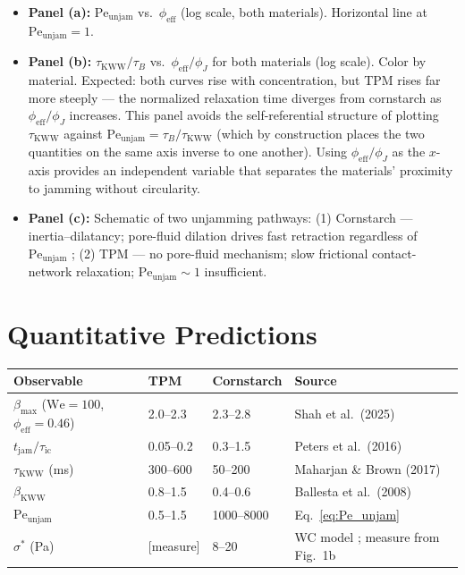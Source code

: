 \documentclass[11pt,letterpaper]{article}
\newcommand{\phieff}{\phi_{\mathrm{eff}}}
\newcommand{\phiJ}{\phi_{J}}
\newcommand{\taukww}{\tau_{\mathrm{KWW}}}
\newcommand{\taub}{\tau_{B}}
\newcommand{\tauic}{\tau_{\mathrm{ic}}}
\newcommand{\tjam}{t_{\mathrm{jam}}}
\newcommand{\peunj}{\mathrm{Pe}_{\mathrm{unjam}}}
\newcommand{\betamax}{\beta_{\max}}
\newcommand{\bkww}{\beta_{\mathrm{KWW}}}
\newcommand{\sigstar}{\sigma^*}
\begin{document}
\begin{itemize}[noitemsep,topsep=3pt]
  \item \textbf{Panel (a):} $\peunj$ vs.\ $\phieff$ (log scale, both materials).
    Horizontal line at $\peunj = 1$.
  \item \textbf{Panel (b):} $\taukww/\taub$ vs.\ $\phieff/\phiJ$ for both
    materials (log scale). Color by material. Expected: both curves rise with
    concentration, but TPM rises far more steeply --- the normalized relaxation
    time diverges from cornstarch as $\phieff/\phiJ$ increases. This panel avoids
    the self-referential structure of plotting $\taukww$ against $\peunj = \taub/\taukww$
    (which by construction places the two quantities on the same axis inverse to one
    another). Using $\phieff/\phiJ$ as the $x$-axis provides an independent variable
    that separates the materials' proximity to jamming without circularity.
  \item \textbf{Panel (c):} Schematic of two unjamming pathways:
    (1) Cornstarch --- inertia--dilatancy; pore-fluid dilation drives fast
    retraction regardless of $\peunj$ \cite{Mobaseri2026};
    (2) TPM --- no pore-fluid mechanism; slow frictional contact-network
    relaxation; $\peunj \sim 1$ insufficient.
\end{itemize}

\section{Quantitative Predictions}

\begin{center}
\begin{tabularx}{\linewidth}{lXXl}
  \toprule
  Observable & TPM & Cornstarch & Source \\
  \midrule
  $\betamax$ ($\mathrm{We}=100$, $\phieff=0.46$)
    & 2.0--2.3
    & 2.3--2.8
    & Shah et al.\ (2025) \cite{Mobaseri2025} \\
  $\tjam/\tauic$
    & 0.05--0.2
    & 0.3--1.5
    & Peters et al.\ (2016) \cite{Peters2016} \\
  $\taukww$ (ms)
    & 300--600
    & 50--200
    & Maharjan \& Brown (2017) \cite{Maharjan2017} \\
  $\bkww$
    & 0.8--1.5
    & 0.4--0.6
    & Ballesta et al.\ (2008) \cite{Ballesta2008} \\
  $\peunj$
    & 0.5--1.5
    & 1000--8000
    & Eq.~\eqref{eq:Pe_unjam} \\
  $\sigstar$ (Pa)
    & [measure]
    & 8--20
    & WC model \cite{WyartCates2014}; measure from Fig.~1b \\
  \bottomrule
\end{tabularx}
\end{center}
\end{document}
